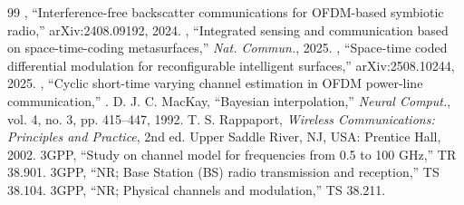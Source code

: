 \begin{thebibliography}{99}
 , ``Interference-free backscatter communications for OFDM-based symbiotic radio,'' arXiv:2408.09192, 2024.
 , ``Integrated sensing and communication based on space-time-coding metasurfaces,'' \emph{Nat. Commun.}, 2025.
 , ``Space-time coded differential modulation for reconfigurable intelligent surfaces,'' arXiv:2508.10244, 2025.
 , ``Cyclic short-time varying channel estimation in OFDM power-line communication,'' .
 D. J. C. MacKay, ``Bayesian interpolation,'' \emph{Neural Comput.}, vol. 4, no. 3, pp. 415--447, 1992.
 T. S. Rappaport, \emph{Wireless Communications: Principles and Practice}, 2nd ed. Upper Saddle River, NJ, USA: Prentice Hall, 2002.
 3GPP, ``Study on channel model for frequencies from 0.5 to 100 GHz,'' TR 38.901.
 3GPP, ``NR; Base Station (BS) radio transmission and reception,'' TS 38.104.
 3GPP, ``NR; Physical channels and modulation,'' TS 38.211.
\end{thebibliography}
